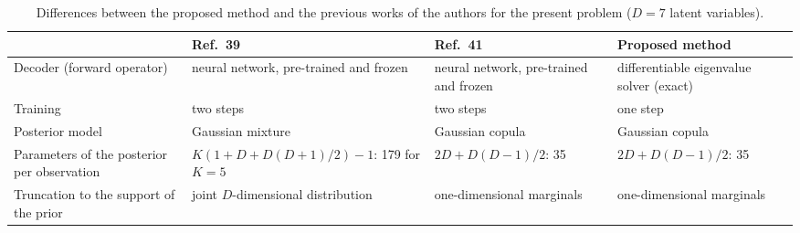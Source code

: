 \documentclass[11pt]{article}
\begin{document}
\begin{table}[H]
\centering\small
\caption{Differences between the proposed method and the previous works of the authors for the present problem
($D=7$ latent variables).}
\label{tab:refs}
\footnotesize
\begin{tabular}{>{\raggedright\arraybackslash}p{4.0cm}>{\raggedright\arraybackslash}p{3.6cm}>{\raggedright\arraybackslash}p{3.4cm}>{\raggedright\arraybackslash}p{3.6cm}}
\toprule
 & Ref.~39 & Ref.~41 & Proposed method \\
\midrule
Decoder (forward operator) & neural network, pre-trained and frozen & neural network, pre-trained and frozen &
differentiable eigenvalue solver (exact) \\
Training & two steps & two steps & one step \\
Posterior model & Gaussian mixture & Gaussian copula & Gaussian copula \\
Parameters of the posterior per observation & $K(1+D+D(D+1)/2)-1$: 179 for $K=5$ & $2D+D(D-1)/2$: 35 & $2D+D(D-1)/2$: 35 \\
Truncation to the support of the prior & joint $D$-dimensional distribution & one-dimensional marginals &
one-dimensional marginals \\
\bottomrule
\end{tabular}
\end{table}
\end{document}
